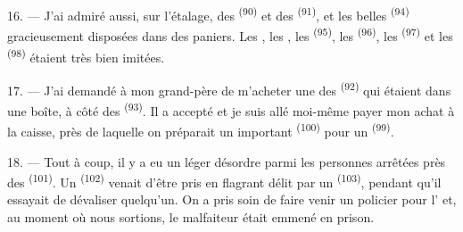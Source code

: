 16. --- J'ai admiré aussi, sur l'étalage, des 
\textsuperscript{(90)} et des 
\textsuperscript{(91)}, et les belles 
\textsuperscript{(94)} gracieusement disposées dans des paniers. Les
, les , les 
\textsuperscript{(95)}, les  \textsuperscript{(96)}, les
 \textsuperscript{(97)} et les 
\textsuperscript{(98)} étaient très bien imitées.

\VUsaut{4.4mm}
\VUsaut{2.8mm}

17. --- J'ai demandé à mon grand-père de m'acheter une des  \textsuperscript{(92)} qui étaient dans une boîte, à côté des
 \textsuperscript{(93)}. Il a accepté et je suis allé
moi-même payer mon achat à la caisse, près de laquelle on préparait un important
 \textsuperscript{(100)} pour un 
\textsuperscript{(99)}.

18. --- Tout à coup, il y a eu un léger désordre parmi les personnes arrêtées
près des  \textsuperscript{(101)}. Un 
\textsuperscript{(102)} venait d'être pris en flagrant délit par un
 \textsuperscript{(103)}, pendant qu'il essayait de
dévaliser quelqu'un. On a pris soin de faire venir un policier pour
l' et, au moment où nous sortions, le malfaiteur était emmené en
prison.
\VUsaut{6.0mm}
\VUfilet{22mm}
